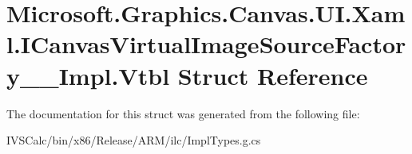 \hypertarget{struct_microsoft_1_1_graphics_1_1_canvas_1_1_u_i_1_1_xaml_1_1_i_canvas_virtual_image_source_factory_____impl_1_1_vtbl}{}\section{Microsoft.\+Graphics.\+Canvas.\+U\+I.\+Xaml.\+I\+Canvas\+Virtual\+Image\+Source\+Factory\+\_\+\+\_\+\+Impl.\+Vtbl Struct Reference}
\label{struct_microsoft_1_1_graphics_1_1_canvas_1_1_u_i_1_1_xaml_1_1_i_canvas_virtual_image_source_factory_____impl_1_1_vtbl}


The documentation for this struct was generated from the following file\+:\begin{DoxyCompactItemize}
\item 
I\+V\+S\+Calc/bin/x86/\+Release/\+A\+R\+M/ilc/Impl\+Types.\+g.\+cs\end{DoxyCompactItemize}
